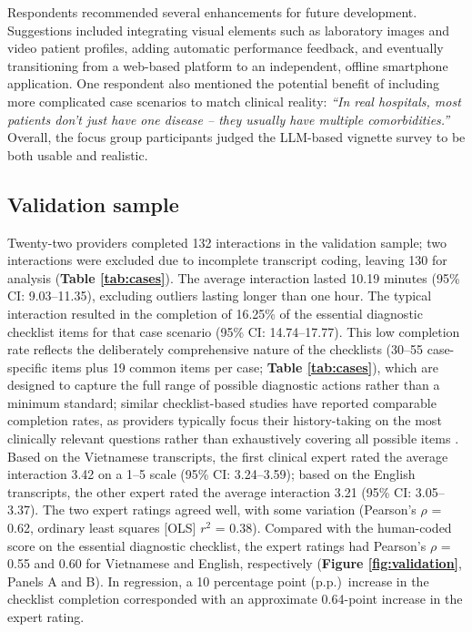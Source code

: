 \documentclass{article}
\begin{document}
Respondents recommended several enhancements for future development. Suggestions included integrating visual elements such as laboratory images and video patient profiles, adding automatic performance feedback, and eventually transitioning from a web-based platform to an independent, offline smartphone application. One respondent also mentioned the potential benefit of including more complicated case scenarios to match clinical reality: \textit{``In real hospitals, most patients don't just have one disease -- they usually have multiple comorbidities.''} Overall, the focus group participants judged the LLM-based vignette survey to be both usable and realistic.

\subsection{Validation sample}

Twenty-two providers completed 132 interactions in the validation sample; two interactions were excluded due to incomplete transcript coding, leaving 130 for analysis (\textbf{Table \ref{tab:cases}}). The average interaction lasted 10.19 minutes (95\% CI: 9.03--11.35), excluding outliers lasting longer than one hour. The typical interaction resulted in the completion of 16.25\% of the essential diagnostic checklist items for that case scenario (95\% CI: 14.74--17.77). This low completion rate reflects the deliberately comprehensive nature of the checklists (30--55 case-specific items plus 19 common items per case; \textbf{Table \ref{tab:cases}}), which are designed to capture the full range of possible diagnostic actions rather than a minimum standard; similar checklist-based studies have reported comparable completion rates, as providers typically focus their history-taking on the most clinically relevant questions rather than exhaustively covering all possible items \citep{das2005which, daniels2024medical}. Based on the Vietnamese transcripts, the first clinical expert rated the average interaction 3.42 on a 1--5 scale (95\% CI: 3.24--3.59); based on the English transcripts, the other expert rated the average interaction 3.21 (95\% CI: 3.05--3.37). The two expert ratings agreed well, with some variation (Pearson's $\rho$ = 0.62, ordinary least squares [OLS] $r^{2}$ = 0.38). Compared with the human-coded score on the essential diagnostic checklist, the expert ratings had Pearson's $\rho$ = 0.55 and 0.60 for Vietnamese and English, respectively (\textbf{Figure \ref{fig:validation}}, Panels A and B). In regression, a 10 percentage point (p.p.)\ increase in the checklist completion corresponded with an approximate 0.64-point increase in the expert rating.
\end{document}
